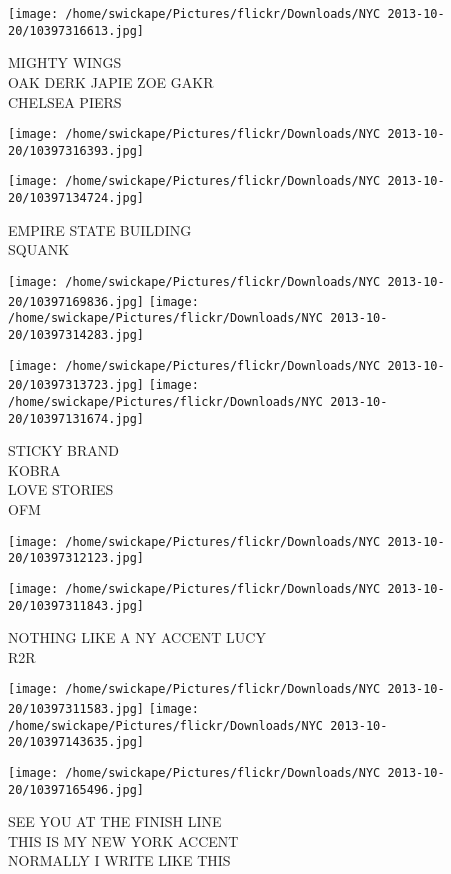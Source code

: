 \documentclass[10pt,letterpaper]{article}
\begin{document}
\vspace{0.25in}
\texttt{[image: /home/swickape/Pictures/flickr/Downloads/NYC 2013-10-20/10397316613.jpg]}

MIGHTY WINGS\\
OAK DERK JAPIE ZOE GAKR\\
CHELSEA PIERS
\pagebreak

\texttt{[image: /home/swickape/Pictures/flickr/Downloads/NYC 2013-10-20/10397316393.jpg]}

\vspace{0.25in}
\texttt{[image: /home/swickape/Pictures/flickr/Downloads/NYC 2013-10-20/10397134724.jpg]}

EMPIRE STATE BUILDING\\
SQUANK
\pagebreak

\texttt{[image: /home/swickape/Pictures/flickr/Downloads/NYC 2013-10-20/10397169836.jpg]}
\texttt{[image: /home/swickape/Pictures/flickr/Downloads/NYC 2013-10-20/10397314283.jpg]}

\texttt{[image: /home/swickape/Pictures/flickr/Downloads/NYC 2013-10-20/10397313723.jpg]}
\texttt{[image: /home/swickape/Pictures/flickr/Downloads/NYC 2013-10-20/10397131674.jpg]}

STICKY BRAND\\
KOBRA\\
LOVE STORIES\\
OFM
\pagebreak

\texttt{[image: /home/swickape/Pictures/flickr/Downloads/NYC 2013-10-20/10397312123.jpg]}

\vspace{0.25in}
\texttt{[image: /home/swickape/Pictures/flickr/Downloads/NYC 2013-10-20/10397311843.jpg]}

NOTHING LIKE A NY ACCENT LUCY\\
R2R
\pagebreak

\texttt{[image: /home/swickape/Pictures/flickr/Downloads/NYC 2013-10-20/10397311583.jpg]}
\texttt{[image: /home/swickape/Pictures/flickr/Downloads/NYC 2013-10-20/10397143635.jpg]}

\vspace{0.25in}
\texttt{[image: /home/swickape/Pictures/flickr/Downloads/NYC 2013-10-20/10397165496.jpg]}

SEE YOU AT THE FINISH LINE\\
THIS IS MY NEW YORK ACCENT\\
NORMALLY I WRITE LIKE THIS
\pagebreak
\end{document}
